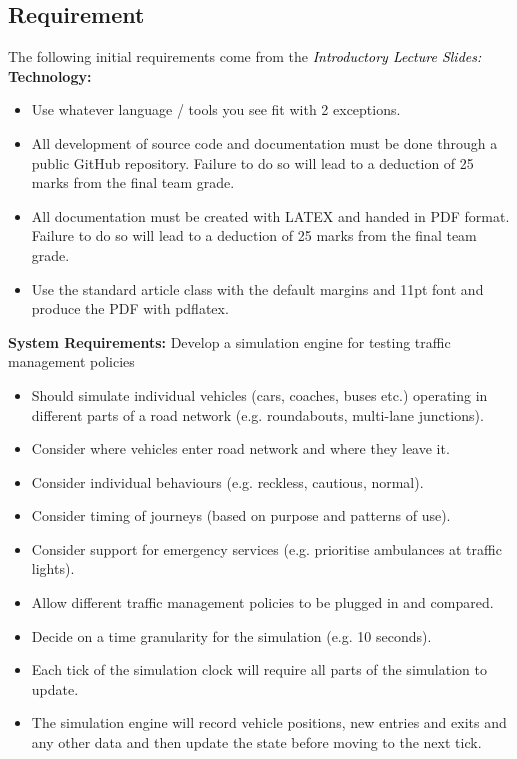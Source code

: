 \documentclass[11pt]{article}
\begin{document}
\subsection{Requirement}
The following initial requirements come from the \textcolor{black}{\emph{Introductory Lecture Slides:}}\\
	{\bf{Technology:}}
	\begin{itemize}[noitemsep]
		\item Use whatever language / tools you see fit with 2 exceptions.
		\item All development of source code and documentation must be
		done through a public GitHub repository. Failure to do so will
		lead to a deduction of 25 marks from the final team grade.
		\item All documentation must be created with LATEX and handed in
		PDF format. Failure to do so will lead to a deduction of 25
		marks from the final team grade.
		\item Use the standard article class with the default margins and
		11pt font and produce the PDF with pdflatex.
	\end{itemize}
	
	{\bf{System Requirements:}} \newline
	\indent Develop a simulation engine for testing traffic management
	policies
	\begin{itemize}[noitemsep]
	\item Should simulate individual vehicles (cars, coaches, buses etc.)
	operating in different parts of a road network (e.g. roundabouts,
	multi-lane junctions).
	\item Consider where vehicles enter road network and where they
	leave it.
	\item Consider individual behaviours (e.g. reckless, cautious, normal).
	\item Consider timing of journeys (based on purpose and patterns of
	use).
	\item Consider support for emergency services (e.g. prioritise
	ambulances at traffic lights).
	\item Allow different traffic management policies to be plugged in and
	compared.
	\item Decide on a time granularity for the simulation (e.g. 10 seconds).
	\item Each tick of the simulation clock will require all parts of the
	simulation to update.
	\item The simulation engine will record vehicle positions, new entries
	and exits and any other data and then update the state before
	moving to the next tick.
	\end{itemize}
	
\end{document}
